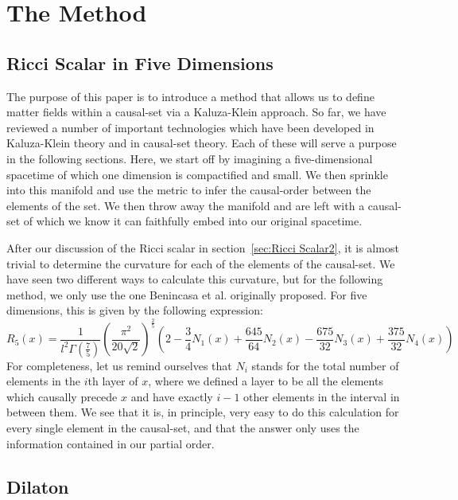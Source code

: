 \documentclass[a4paper,12pt]{article}
\numberwithin{equation}{section}
\begin{document}
\section{The Method}
\label{sec:The Method}
\subsection{Ricci Scalar in Five Dimensions}
\label{sec:Ricci Scalar in Five Dimensions}

The purpose of this paper is to introduce a method that allows us to define matter fields within a causal-set via a Kaluza-Klein approach. So far, we have reviewed a number of important technologies which have been developed in Kaluza-Klein theory and in causal-set theory. Each of these will serve a purpose in the following sections. Here, we start off by imagining a five-dimensional spacetime of which one dimension is compactified and small. We then sprinkle into this manifold and use the metric to infer the causal-order between the elements of the set. We then throw away the manifold and are left with a causal-set of which we know it can faithfully embed into our original spacetime.

After our discussion of the Ricci scalar in section~\ref{sec:Ricci Scalar2}, it is almost trivial to determine the curvature for each of the elements of the causal-set. We have seen two different ways to calculate this curvature, but for the following method, we only use the one Benincasa et al. originally proposed. For five dimensions, this is given by the following expression:
\begin{equation}
\label{eq:Ricci scalar in five dimensions}
R_5 (x)=\frac{1}{l^2 \Gamma (\frac{7}{5})}\left(\frac{\pi^2}{20\sqrt{2}}\right)^{\frac{2}{5}} \left(2-\frac{3}{4}N_1(x)+\frac{645}{64}N_2(x)-\frac{675}{32}N_3(x)+\frac{375}{32}N_4(x) \right)
\end{equation}
For completeness, let us remind ourselves that $N_i$ stands for the total number of elements in the $i$th layer of $x$, where we defined a layer to be all the elements which causally precede $x$ and have exactly $i-1$ other elements in the interval in between them. We see that it is, in principle, very easy to do this calculation for every single element in the causal-set, and that the answer only uses the information contained in our partial order.


\subsection{Dilaton}
\label{sec:Dilaton2}
\end{document}
